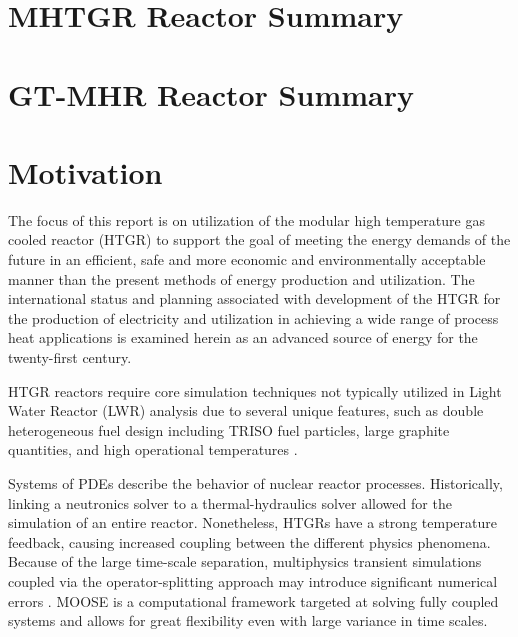 \documentclass[11pt,letterpaper]{article}
\begin{document}
\section{MHTGR Reactor Summary}















\section{GT-MHR Reactor Summary}


\section{Motivation}

The focus of this report is on utilization of the modular high temperature gas cooled
reactor (HTGR) to support the goal of meeting the energy demands of the future in an
efficient, safe and more economic and environmentally acceptable manner than the present
methods of energy production and utilization. The international status and planning associated
with development of the HTGR for the production of electricity and utilization in achieving a
wide range of process heat applications is examined herein as an advanced source of energy
for the twenty-first century.
\cite{iaea_current_2001}

HTGR reactors require core simulation techniques not typically utilized in Light Water Reactor (LWR) analysis due to several unique features, such as double heterogeneous fuel design including \gls{TRISO} fuel particles, large graphite quantities, and high operational temperatures \cite{bostelmann_criticality_2016}.


Systems of \glspl{PDE} describe the behavior of nuclear reactor processes.
Historically, linking a neutronics solver to a thermal-hydraulics solver allowed for the simulation of an entire reactor.
Nonetheless, \glspl{HTGR} have a strong temperature feedback, causing increased coupling between the different physics phenomena.
Because of the large time-scale separation, multiphysics transient simulations coupled via the operator-splitting approach may introduce significant numerical errors \cite{ragusa_consistent_2009} \cite{park_tightly_2010}.
\gls{MOOSE} \cite{gaston_moose_2009} is a computational framework targeted at solving fully coupled systems and allows for great flexibility even with large variance in time scales.
\end{document}
